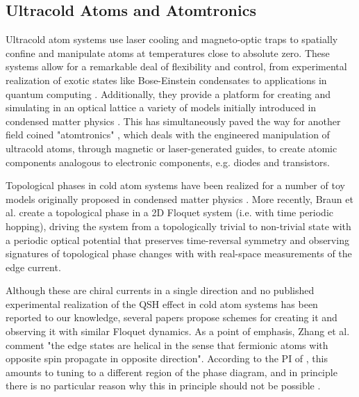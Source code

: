 \documentclass[onecolumn,
               superscriptaddress,
               floatfix,
               longbibliography, 
               showkeys,apl]{revtex4-2}
\begin{document}
\begin{appendices}
\section{Ultracold Atoms and Atomtronics}\label{sec:ColdAtoms}

Ultracold atom systems use laser cooling and magneto-optic traps to spatially confine and manipulate atoms at temperatures close to absolute zero. These systems allow for a remarkable deal of flexibility and control, from experimental realization of exotic states like Bose-Einstein condensates \cite{RevModPhys.80.885} to applications in quantum computing \cite{PhysRevResearch.3.013113}. Additionally, they provide a platform for creating and simulating in an optical lattice a variety of models initially introduced in condensed matter physics \cite{TARRUELL2018365,Sch_fer_2020}. This has simultaneously paved the way for another field coined "atomtronics" \cite{Amico_2021}, which deals with the engineered manipulation of ultracold atoms, through magnetic or laser-generated guides, to create atomic components analogous to electronic components, e.g. diodes and transistors.

Topological phases in cold atom systems have been realized for a number of toy models originally proposed in condensed matter physics \cite{Zhang_2018,Wintersperger_2020}. More recently, Braun et al. \cite{braun2023realspace} create a topological phase in a 2D Floquet system (i.e. with time periodic hopping), driving the system from a topologically trivial to non-trivial state with a periodic optical potential that preserves time-reversal symmetry and observing signatures of topological phase changes with with real-space measurements of the edge current.

Although these are chiral currents in a single direction and no published experimental realization of the QSH effect in cold atom systems has been reported to our knowledge, several papers propose schemes for creating it \cite{PhysRevLett.111.225301,PhysRevA.82.053605,PhysRevLett.109.205303,PhysRevLett.105.255302,Yan2015} and observing it \cite{doi:10.1073/pnas.1300170110} with similar Floquet dynamics. As a point of emphasis, Zhang et al. \cite{Yan2015} comment "the edge states are helical in the sense that fermionic atoms with opposite spin propagate in opposite direction". According to the PI of \cite{braun2023realspace}, this amounts to tuning to a different region of the phase diagram, and in principle there is no particular reason why this in principle should not be possible \cite{AidelsburgerPrivateComm}. 


\end{appendices}
\end{document}
